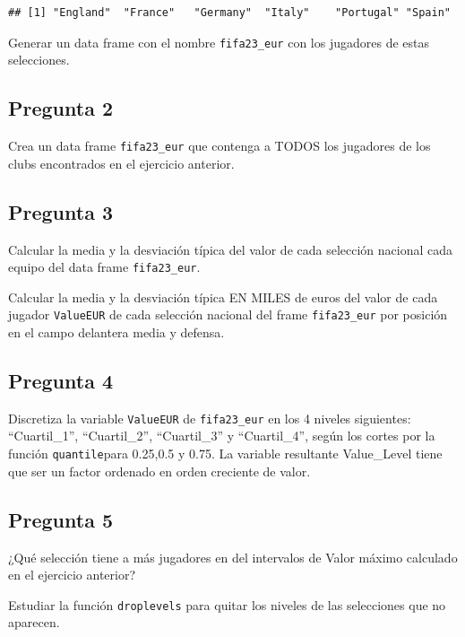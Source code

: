 \documentclass[
]{article}
\begin{document}
\begin{verbatim}
## [1] "England"  "France"   "Germany"  "Italy"    "Portugal" "Spain"
\end{verbatim}

Generar un data frame con el nombre \texttt{fifa23\_eur} con los
jugadores de estas selecciones.

\hypertarget{pregunta-2}{%
\subsection{Pregunta 2}\label{pregunta-2}}

Crea un data frame \texttt{fifa23\_eur} que contenga a TODOS los
jugadores de los clubs encontrados en el ejercicio anterior.

\hypertarget{pregunta-3}{%
\subsection{Pregunta 3}\label{pregunta-3}}

Calcular la media y la desviación típica del valor de cada selección
nacional cada equipo del data frame \texttt{fifa23\_eur}.

Calcular la media y la desviación típica EN MILES de euros del valor de
cada jugador \texttt{ValueEUR} de cada selección nacional del frame
\texttt{fifa23\_eur} por posición en el campo delantera media y defensa.

\hypertarget{pregunta-4}{%
\subsection{Pregunta 4}\label{pregunta-4}}

Discretiza la variable \texttt{ValueEUR} de \texttt{fifa23\_eur} en los
4 niveles siguientes: ``Cuartil\_1'', ``Cuartil\_2'', ``Cuartil\_3'' y
``Cuartil\_4'', según los cortes por la función \texttt{quantile}para
0.25,0.5 y 0.75. La variable resultante Value\_Level tiene que ser un
factor ordenado en orden creciente de valor.

\hypertarget{pregunta-5}{%
\subsection{Pregunta 5}\label{pregunta-5}}

¿Qué selección tiene a más jugadores en del intervalos de Valor máximo
calculado en el ejercicio anterior?

Estudiar la función \texttt{droplevels} para quitar los niveles de las
selecciones que no aparecen.
\end{document}
